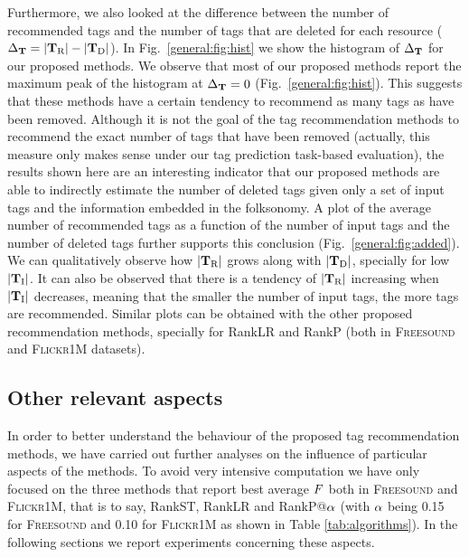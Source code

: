 Furthermore, we also looked at the difference between the number of recommended tags and the number of tags that are deleted for each resource ($\Delta_{\mathbf{T}} = |\mathbf{T}_{\text{R}}| - |\mathbf{T}_{\text{D}}|$). 
In Fig.~\ref{general:fig:hist} we show the histogram of $\Delta_{\mathbf{T}}$ for our proposed methods. We observe that most of our proposed methods report the maximum peak of the histogram at $\Delta_{\mathbf{T}} = 0$ (Fig.~\ref{general:fig:hist}). This suggests that these methods have a certain tendency to recommend as many tags as have been removed. 
Although it is not the goal of the tag recommendation methods to recommend the exact number of tags that have been removed (actually, this measure only makes sense under our tag prediction task-based evaluation), the results shown here are an interesting indicator that our proposed methods are able to indirectly estimate the number of deleted tags given only a set of input tags and the information embedded in the folksonomy. A plot of the average number of recommended tags as a function of the number of input tags and the number of deleted tags further supports this conclusion (Fig.~\ref{general:fig:added}). We can qualitatively observe how $|\mathbf{T}_{\text{R}}|$ grows along with $|\mathbf{T}_{\text{D}}|$, specially for low $|\mathbf{T}_{\text{I}}|$. 
It can also be observed that there is a tendency of $|\mathbf{T}_{\text{R}}|$ increasing when $|\mathbf{T}_{\text{I}}|$ decreases, meaning that the smaller the number of input tags, the more tags are recommended. 
Similar plots can be obtained with the other proposed recommendation methods, specially for RankLR and RankP (both in \textsc{Freesound} and \textsc{Flickr1M} datasets).


\subsection{Other relevant aspects}

In order to better understand the behaviour of the proposed tag recommendation methods, we have carried out further analyses on the influence of particular aspects of the methods. To avoid very intensive computation we have only focused on the three methods that report best average $F$ both in \textsc{Freesound} and \textsc{Flickr1M}, that is to say, RankST, RankLR and RankP@$\alpha$ (with $\alpha$ being 0.15 for \textsc{Freesound} and 0.10 for \textsc{Flickr1M} as shown in Table \ref{tab:algorithms}). In the following sections we report experiments concerning these aspects.

